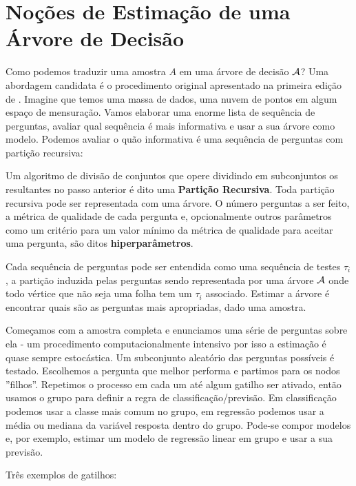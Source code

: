 \section{Noções de Estimação de uma Árvore de Decisão}

Como podemos traduzir uma amostra $A$ em uma árvore de decisão $\mathcal{A}$? Uma abordagem candidata é o procedimento original apresentado na primeira edição de . Imagine que temos uma massa de dados, uma nuvem de pontos em algum espaço de mensuração. Vamos elaborar uma enorme lista de sequência de perguntas, avaliar qual sequência é mais informativa e usar a sua árvore como modelo. Podemos avaliar o quão informativa é uma sequência de perguntas com partição recursiva:

\begin{defi}
Um algoritmo de divisão de conjuntos que opere dividindo em subconjuntos os resultantes no passo anterior é dito uma \textbf{Partição Recursiva}. Toda partição recursiva pode ser representada com uma árvore. O número perguntas a ser feito, a métrica de qualidade de cada pergunta e, opcionalmente outros parâmetros como um critério para um valor mínimo da métrica de qualidade para aceitar uma pergunta, são ditos \textbf{hiperparâmetros}.
\end{defi}

Cada sequência de perguntas pode ser entendida como uma sequência de testes $\tau_i$, a partição induzida pelas perguntas sendo representada por uma árvore $\mathcal{A}$ onde todo vértice que não seja uma folha tem um $\tau_i$ associado. Estimar a árvore é encontrar quais são as perguntas mais apropriadas, dado uma amostra. 

Começamos com a amostra completa e enunciamos uma série de perguntas sobre ela - um procedimento computacionalmente intensivo por isso a estimação é quase sempre estocástica. Um subconjunto aleatório das perguntas possíveis é testado. Escolhemos a pergunta que melhor performa e partimos para os nodos ''filhos''. Repetimos o processo em cada um até algum gatilho ser ativado, então usamos o grupo para definir a regra de classificação/previsão. Em classificação podemos usar a classe mais comum no grupo, em regressão podemos usar a média ou mediana da variável resposta dentro do grupo. Pode-se compor modelos e, por exemplo, estimar um modelo de regressão linear em grupo e usar a sua previsão.  

Três exemplos de gatilhos:


